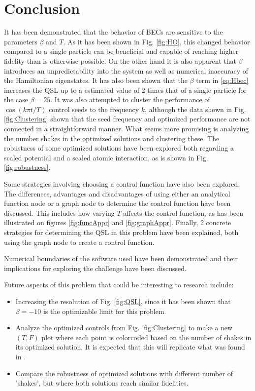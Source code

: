 \documentclass[aps,pra,reprint,superscriptaddress]{revtex4-1}
\begin{document}
\section{\label{sec:conclusion}Conclusion}
It has been demonstrated that the behavior of BECs are sensitive to the parameters $\beta$ and $T$. As it has been shown in Fig. \ref{fig:HO}, this changed behavior compared to a single particle can be beneficial and capable of reaching higher fidelity than is otherwise possible. On the other hand it is also apparent that $\beta$ introduces an unpredictability into the system as well as numerical inaccuracy of the Hamiltonian eigenstates. It has also been shown that the $\beta$ term in \eqref{eq:Hbec} increases the QSL up to a estimated value of 2 times that of a single particle for the case $\beta=25$. It was also attempted to cluster the performance of $\cos(k\pi t/T)$ control seeds to the frequency $k$, although the data shown in Fig. \ref{fig:Clustering} shown that the seed frequency and optimized performance are not connected in a straightforward manner. What seems more promising is analyzing the number shakes in the optimized solutions and clustering these. The robustness of some optimized solutions have been explored both regarding a scaled potential and a scaled atomic interaction, as is shown in Fig. \ref{fig:robustness}.

Some strategies involving choosing a control function have also been explored. The differences, advantages and disadvantages of using either an analytical function node or a graph node to determine the control function have been discussed. This includes how varying $T$ affects the control function, as has been illustrated on figures \ref{fig:funcAppr} and \ref{fig:graphAppr}. Finally, 2 concrete strategies for determining the QSL in this problem have been explained, both using the graph node to create a control function. 

Numerical boundaries of the software used have been demonstrated and their implications for exploring the challenge have been discussed.

Future aspects of this problem that could be interesting to research include:
\begin{itemize}
	\item Increasing the resolution of Fig. \ref{fig:QSL}, since it has been shown that $\beta=-10$ is the optimizable limit for this problem.
	\item Analyze the optimized controls from Fig. \ref{fig:Clustering} to make a new $(T,F)$ plot where each point is colorcoded based on the number of shakes in its optimized solution. It is expected that this will replicate what was found in \cite{QM2Paper}.
	\item Compare the robustness of optimized solutions with different number of 'shakes', but where both solutions reach similar fidelities.
\end{itemize}


\end{document}
